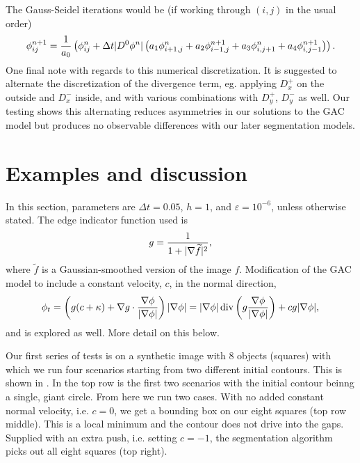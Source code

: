 The Gauss-Seidel iterations would be (if working through $(i,j)$ in the usual order)
\begin{align*}
\phi^{n+1}_{ij} 
= \frac{1}{a_0} 
\left( \phi^n_{ij} + \Delta t \lvert D^0 \phi^n\rvert
\left( a_1 \phi^n_{i+1,j} + a_2 \phi^{n+1}_{i-1,j} + a_3 \phi^{n}_{i,j+1} + a_4 \phi^{n+1}_{i,j-1}
\right)
\right).
\end{align*}
One final note with regards to this numerical discretization. It is suggested to alternate the discretization of the divergence term, eg. applying $D^+_x$ on the outside and $D^-_x$ inside, and with various combinations with $D^+_y$, $D^-_y$ as well. Our testing shows this alternating reduces asymmetries in our solutions to the GAC model but produces no observable differences with our later segmentation models.


\section{Examples and discussion} 
In this section, parameters are $\Delta t = 0.05$, $h = 1$, and $\varepsilon = 10^{-6}$, unless otherwise stated.
The edge indicator function used is 
\begin{align}
g = \frac{1}{1 + \lvert\nabla \widetilde f\rvert^2 },
\label{eq:edge_indicator}
\end{align}
where $\widetilde f$ is a Gaussian-smoothed version of the image $f$. Modification of the GAC model to include a constant velocity, $c$, in the normal direction, 
\begin{align}
\phi_t 
= \left( g ( c + \kappa) + \nabla g \cdot \frac{\nabla \phi}{\lvert\nabla \phi\rvert} \right) \lvert\nabla \phi\rvert
= 
\lvert\nabla \phi\rvert \operatorname{div}\left( g \frac{\nabla \phi}{\lvert\nabla \phi\rvert} \right) 
+ cg \lvert\nabla \phi\rvert,
\label{eq:gac+c}
\end{align}
and is explored as well. More detail on this below.


Our first series of tests is on a synthetic image with 8 objects (squares) with which we run four scenarios starting from two different initial contours. This is shown in . In the top row is the first two scenarios with the initial contour  beinng a single, giant circle. From here we run two cases. With no added constant normal velocity, i.e. $c = 0$, we get a bounding box on our eight squares (top row middle). This is a local minimum and the contour does not drive into the gaps. Supplied with an extra push, i.e. setting $c = -1$, the segmentation algorithm picks out all eight squares (top right).
	

